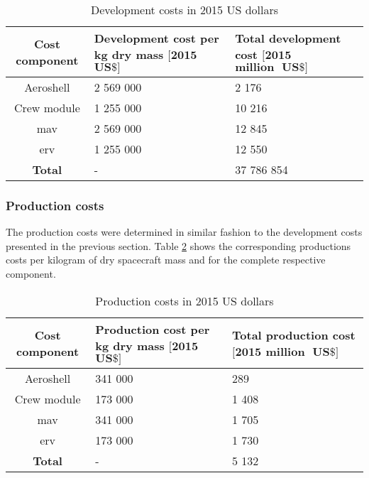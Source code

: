 \begin{table}
	\centering
	\caption{Development costs in 2015 US dollars}
	\begin{tabular}{|c|p{5cm}|p{5cm}|}
		\hline
		\textbf{Cost component} & \textbf{Development cost per kg dry mass $\mathbf{[2015}$ $\mathbf{US\$]}$} & \textbf{Total development cost $\mathbf{[2015}$ $\mathbf{million \mbox{ } US\$]}$} \\ \hline \hline
		Aeroshell & 2 569 000 & 2 176 \\
		Crew module & 1 255 000 & 10 216 \\
		\acrlong{mav} & 2 569 000 & 12 845  \\
		\acrlong{erv} & 1 255 000 & 12 550  \\ \hline
		\textbf{Total} & - & 37 786 854 \\
		\hline
	\end{tabular}
	\label{tab:devcosts}
\vspace{-2mm}
\end{table}

\subsubsection{Production costs}
The production costs were determined in similar fashion to the development costs presented in the previous section. Table \ref{tab:productioncosts} shows the corresponding productions costs per kilogram of dry spacecraft mass and for the complete respective component.

\begin{table}[h]
	\centering
	\caption{Production costs in 2015 US dollars}
	\begin{tabular}{|c|p{5cm}|p{5cm}|}
		\hline
		\textbf{Cost component} & \textbf{Production cost per kg dry mass $\mathbf{[2015}$ $\mathbf{US\$]}$} & \textbf{Total production cost $\mathbf{[2015}$ $\mathbf{million \mbox{ } US\$]}$} \\
		\hline \hline
		Aeroshell & 341 000 & 289 \\
		Crew module & 173 000 & 1 408 \\ 
		\acrlong{mav} & 341 000 & 1 705 \\
		\acrlong{erv} & 173 000 & 1 730 \\ \hline
		\textbf{Total} & - & 5 132 \\
		\hline
	\end{tabular}
	\label{tab:productioncosts}
\vspace{-2mm}
\end{table}

